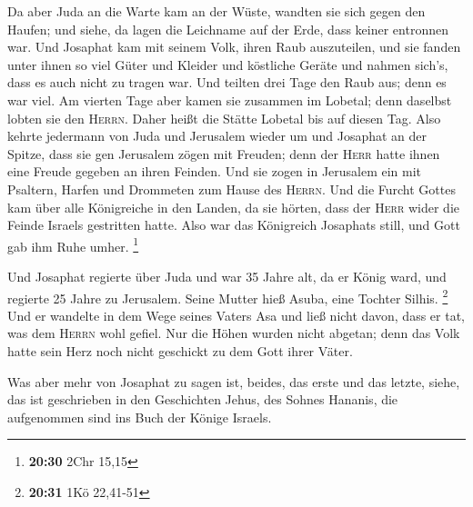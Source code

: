  Da aber Juda an die Warte kam an der Wüste, wandten sie
sich gegen den Haufen; und siehe, da lagen die Leichname auf der Erde,
dass keiner entronnen war.  Und Josaphat kam mit seinem
Volk, ihren Raub auszuteilen, und sie fanden unter ihnen so viel Güter
und Kleider und köstliche Geräte und nahmen sich's, dass es auch nicht
zu tragen war. Und teilten drei Tage den Raub aus; denn es war viel.
 Am vierten Tage aber kamen sie zusammen im Lobetal; denn
daselbst lobten sie den \textsc{Herrn}. Daher heißt die Stätte Lobetal
bis auf diesen Tag.  Also kehrte jedermann von Juda und
Jerusalem wieder um und Josaphat an der Spitze, dass sie gen Jerusalem
zögen mit Freuden; denn der \textsc{Herr} hatte ihnen eine Freude
gegeben an ihren Feinden.  Und sie zogen in Jerusalem ein
mit Psaltern, Harfen und Drommeten zum Hause des \textsc{Herrn}.
 Und die Furcht Gottes kam über alle Königreiche in den
Landen, da sie hörten, dass der \textsc{Herr} wider die Feinde Israels
gestritten hatte.  Also war das Königreich Josaphats
still, und Gott gab ihm Ruhe umher. \footnote{\textbf{20:30} 2Chr 15,15}

 Und Josaphat regierte über Juda und war 35 Jahre alt, da
er König ward, und regierte 25 Jahre zu Jerusalem. Seine Mutter hieß
Asuba, eine Tochter Silhis. \footnote{\textbf{20:31} 1Kö 22,41-51}
 Und er wandelte in dem Wege seines Vaters Asa und ließ
nicht davon, dass er tat, was dem \textsc{Herrn} wohl gefiel.
 Nur die Höhen wurden nicht abgetan; denn das Volk hatte
sein Herz noch nicht geschickt zu dem Gott ihrer Väter.

 Was aber mehr von Josaphat zu sagen ist, beides, das
erste und das letzte, siehe, das ist geschrieben in den Geschichten
Jehus, des Sohnes Hananis, die aufgenommen sind ins Buch der Könige
Israels.

